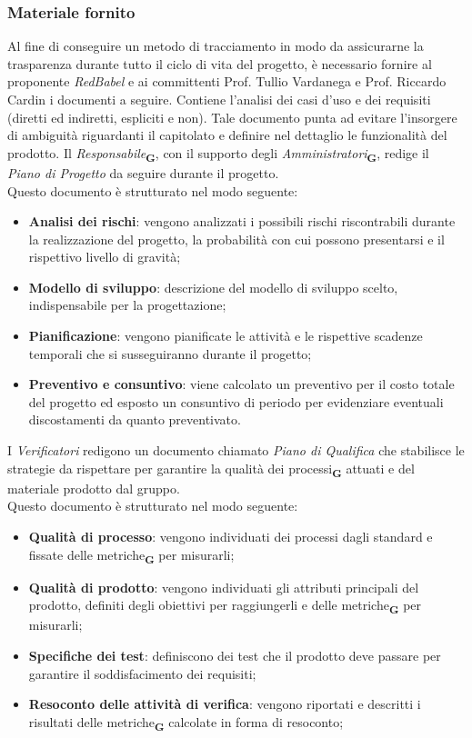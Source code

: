 \subsubsection{Materiale fornito}
Al fine di conseguire un metodo di tracciamento in modo da assicurarne la trasparenza durante tutto il ciclo di vita del progetto, è necessario fornire al proponente \textit{RedBabel} e ai committenti Prof. Tullio Vardanega e Prof. Riccardo Cardin i documenti a seguire.
Contiene l'analisi dei casi d'uso e dei requisiti (diretti ed indiretti, espliciti e non). Tale documento punta ad evitare
l'insorgere di ambiguità riguardanti il capitolato e definire nel dettaglio le funzionalità del prodotto.
Il \textit{Responsabile}\textsubscript{\textbf{G}}, con il supporto degli \textit{Amministratori}\textsubscript{\textbf{G}}, redige il \textit{Piano di Progetto} da seguire durante il progetto.
\\Questo documento è strutturato nel modo seguente:
\begin{itemize}
    \item \textbf{Analisi dei rischi}: vengono analizzati i possibili rischi riscontrabili durante la realizzazione del progetto, la probabilità con cui possono presentarsi e il rispettivo livello di gravità;
    \item \textbf{Modello di sviluppo}: descrizione del modello di sviluppo scelto, indispensabile per la progettazione;
    \item \textbf{Pianificazione}: vengono pianificate le attività e le rispettive scadenze temporali che si susseguiranno durante il progetto;
    \item \textbf{Preventivo e consuntivo}: viene calcolato un preventivo per il costo totale del progetto ed esposto un consuntivo di periodo per evidenziare eventuali discostamenti da quanto preventivato.
\end{itemize}
I \textit{Verificatori} redigono un documento chiamato \textit{Piano di Qualifica} che stabilisce le strategie da rispettare per garantire la qualità dei processi\textsubscript{\textbf{G}} attuati e del materiale prodotto dal gruppo.
\\Questo documento è strutturato nel modo seguente:
\begin{itemize}
    \item \textbf{Qualità di processo}: vengono individuati dei processi dagli standard e fissate delle metriche\textsubscript{\textbf{G}} per misurarli;
    \item \textbf{Qualità di prodotto}: vengono individuati gli attributi principali del prodotto, definiti degli obiettivi per raggiungerli e delle metriche\textsubscript{\textbf{G}} per misurarli;
    \item \textbf{Specifiche dei test}: definiscono dei test che il prodotto deve passare per garantire il soddisfacimento dei requisiti;
    \item \textbf{Resoconto delle attività di verifica}: vengono riportati e descritti i risultati delle metriche\textsubscript{\textbf{G}} calcolate in forma di resoconto;
\end{itemize}
